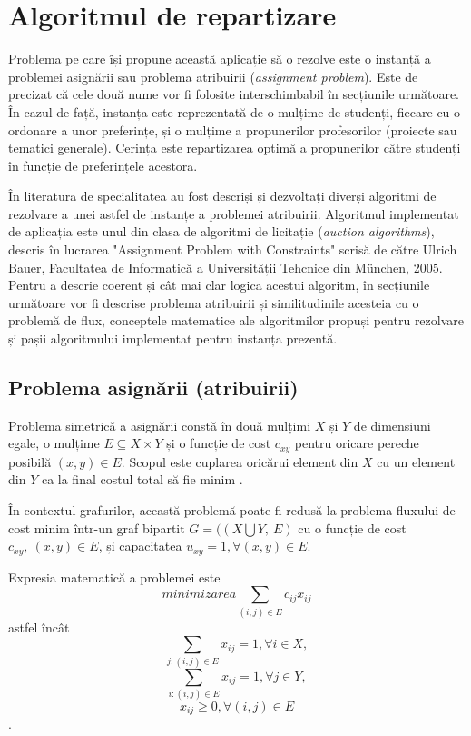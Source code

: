 \chapter{Algoritmul de repartizare}

Problema pe care își propune această aplicație să o rezolve este o instanță a problemei asignării sau problema atribuirii (\textit{assignment problem}). Este de precizat că cele două nume vor fi folosite interschimbabil în secțiunile următoare. În cazul de față, instanța este reprezentată de o mulțime de studenți, fiecare cu o ordonare a unor preferințe, și o mulțime a propunerilor profesorilor (proiecte sau tematici generale). Cerința este repartizarea optimă a propunerilor către studenți în funcție de preferințele acestora.

În literatura de specialitatea au fost descriși și dezvoltați diverși algoritmi de rezolvare a unei astfel de instanțe a problemei atribuirii. Algoritmul implementat de aplicația \thesistitle{} este unul din clasa de algoritmi de licitație (\textit{auction algorithms}), descris în lucrarea "Assignment Problem with Constraints" scrisă de către Ulrich Bauer, Facultatea de Informatică a Universității Tehcnice din München, 2005. Pentru a descrie coerent și cât mai clar logica acestui algoritm, în secțiunile următoare vor fi descrise problema atribuirii și similitudinile acesteia cu o problemă de flux, conceptele matematice ale algoritmilor propuși pentru rezolvare și pașii algoritmului implementat pentru instanța prezentă.

\section{Problema asignării (atribuirii)}

Problema simetrică a asignării constă în două mulțimi $X$ și $Y$ de dimensiuni egale, o mulțime $E \subseteq X \times Y$ și o funcție de cost $c_{xy}$ pentru oricare pereche posibilă $(x, y) \in E$. Scopul este cuplarea oricărui element din $X$ cu un element din $Y$ ca la final costul total să fie minim \cite{assignment}.

În contextul grafurilor, această problemă poate fi redusă la problema fluxului de cost minim într-un  graf bipartit $G=((X \bigcup Y,\ E)$ cu o funcție de cost $c_{xy},\ (x, y) \in E$, și capacitatea $u_{xy} = 1, \forall (x, y) \in E$. 

Expresia matematică a problemei \cite[p.~6]{assignment} este 
\[ minimizarea \sum_{(i, j) \in E} c_{ij} x_{ij} \]
astfel încât
\[ \sum_{j:(i, j) \in E} x_{ij} = 1, \forall i \in X, \]
\[ \sum_{i:(i, j) \in E} x_{ij} = 1, \forall j \in Y, \]
\[ x_{ij} \geq 0, \forall (i, j) \in E \].

